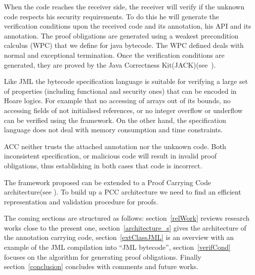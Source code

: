 When the code reaches the receiver side, the receiver will verify if the unknown code respects his security requirements. To do this he will generate the verification conditions upon the received code and its annotation, his API and its annotation. The proof obligations are generated using a weakest precondition calculus (WPC) that we define for java bytecode. The WPC defined deals with normal and exceptional termination. Once the verification conditions are generated, they are proved by the Java Correctness Kit(JACK)(see~\cite{BRL-JACK}). 
 
Like JML the bytecode specification language is suitable for verifying a large set of properties (including functional and security ones) that can be encoded in Hoare logics. For example that no accessing of arrays out of its bounds, no accessing fields of not initialised references, or no integer overflow or underflow can be verified using the framework. On the other hand, the specification language does not deal with memory consumption and time constraints.

ACC neither trusts the attached annotation nor the unknown code. Both inconsistent specification, or malicious code will result in invalid proof obligations, thus establishing in both cases that code is incorrect. 

The framework proposed can be extended to a Proof Carrying Code architecture(see \cite{Necula97}). To build up a PCC architecture we need to find an efficient representation and validation procedure for proofs.

The coming sections are structured as follows: section~\ref{relWork} reviews research works close to the present one, section~\ref{architecture_s} gives the architecture of the annotation carrying code, section~\ref{extClassJML} is an overview with an example of the JML compilation into ``JML bytecode'', section~\ref{verifCond} focuses on the algorithm for generating proof obligations. Finally section~\ref{conclusion} concludes with comments and future works.
 
